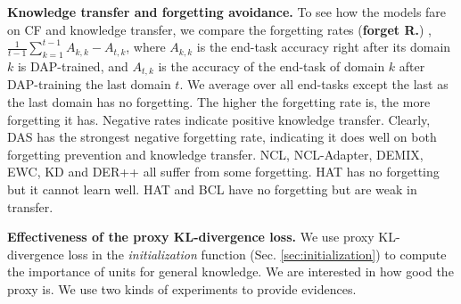 \documentclass{article} \usepackage{iclr2023_conference,times}
\begin{document}
\textbf{Knowledge transfer and forgetting avoidance.} To see how the models fare on CF and knowledge transfer, we compare the forgetting rates (\textbf{forget R.}) \citep{DBLP:conf/cvpr/LiuSLSS20}, $\frac{1}{t-1}\sum_{k=1}^{t-1}A_{k,k} - A_{t,k}$, where $A_{k,k}$ is the end-task accuracy right after its domain $k$ is DAP-trained, and $A_{t,k}$ is the accuracy of the end-task of domain $k$ after DAP-training the last domain $t$. We average over all end-tasks except the last as the last domain has no forgetting. The higher the forgetting rate is, the more forgetting it has. Negative rates indicate positive knowledge transfer. Clearly, DAS has the strongest negative forgetting rate, indicating it does well on both forgetting prevention and knowledge transfer. NCL, NCL-Adapter, DEMIX, EWC, KD and DER++ all suffer from some forgetting. HAT has no forgetting but it cannot learn well. HAT and BCL have no forgetting but are weak in  transfer.


\textbf{Effectiveness of the proxy KL-divergence loss.} We use proxy KL-divergence loss in the \textit{initialization} function (Sec. \ref{sec:initialization}) to compute the importance of units for general knowledge. We are interested in how good the proxy is. We use two kinds of experiments to provide evidences. 
\end{document}
